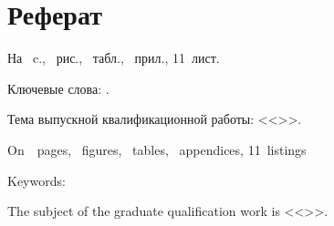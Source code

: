 \chapter*[Count-me]{Реферат} %
\thispagestyle{empty}%
%
%




На ~c.,  
~{рис.},
~{табл.},
~{прил.}, %
11~{лист.}



{Ключевые слова: \keywordsRu}. %

Тема выпускной квалификационной работы: <<\thesisTitle>>. %

\abstractRu %



\printTheAbstract %


On~~pages, 
~figures, 
~tables,
~appendices, 11~{listings}%

{Keywords: \keywordsEn} %

The subject of the graduate qualification work is <<\thesisTitleEn>>.


\abstractEn %

\abstractEn %



\thispagestyle{empty}
%
